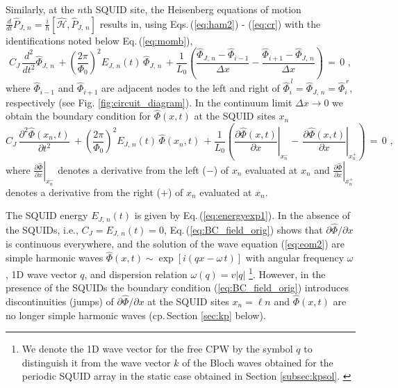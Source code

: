 Similarly, at the $n$th SQUID site, the Heisenberg equations of motion
$\displaystyle \frac{d}{dt} \hat{P}_{J,\,n} = \frac{i}{\hbar} \left[\hat{\mathcal{H}}, \hat{P}_{J,\,n} \right]$ 
results in, using Eqs.\,(\ref{eq:ham2}) - (\ref{eq:cr}) with the identifications noted below
Eq.\,(\ref{eq:momb}), 
%
\begin{equation}\label{eq:BC_discrete}
C_{J} \, \frac{d^2}{dt^2} \hat{\Phi}_{J,\,n} \, + \left(\frac{2 \pi}{\Phi_{0}} \right)^{2} E_{J,\,n}(t) \, \hat{\Phi}_{J, \, n}
\, + \frac{1}{L_{0}} 
\left( \frac{\hat{\Phi}_{J,\,n} - \hat{\Phi}_{i-1}}{\Delta x} - \frac{\hat{\Phi}_{i+1} - \hat{\Phi}_{J,\,n}}{\Delta x} \right)
\, = \, 0 \, \, ,
\end{equation}
%
where $\hat{\Phi}_{i-1}$ and $\hat{\Phi}_{i+1}$ are adjacent nodes to the left and right of 
$\hat{\Phi}_i^{\,l} = \hat{\Phi}_{J,\,n} = \hat{\Phi}_i^{\,r}$, respectively (see Fig. \ref{fig:circuit_diagram}). 
In the continuum limit $\Delta x \to 0$ we obtain the boundary condition for $\hat{\Phi}(x, t)$ 
at the SQUID sites $x_n$
%
\begin{equation}\label{eq:BC_field_orig}
C_{J} \, \frac{\partial^2 \hat{\Phi}(x_n, t)}{\partial t^2} \, + 
\left(\frac{2 \pi}{\Phi_{0}}\right)^{2} E_{J,\,n}(t) \, \hat{\Phi}(x_n, t) \, + 
\frac{1}{L_{0}}\left(\left.\frac{\partial \hat{\Phi}(x, t)}{\partial x}\right|_{x_n^{-}}
- \, \left.\frac{\partial \hat{\Phi}(x,t)}{\partial x}\right|_{x_n^{+}}\right) \, = \, 0 \, \, ,
\end{equation}
%
where $\displaystyle \left.\frac{\partial \hat{\Phi}}{\partial x}\right|_{x_n^{-}}$
denotes a derivative from the left ($-$) of $x_n$ evaluated at $x_n$ and
$\displaystyle \left.\frac{\partial \hat{\Phi}}{\partial x}\right|_{x_n^{+}}$
denotes a derivative from the right ($+$) of $x_n$ evaluated at $x_n$. 

The SQUID energy $E_{J,\,n}(t)$ is given by Eq.\,(\ref{eq:energyexp1}). 
%
In the absence of the SQUIDs, i.e., $C_J = E_{J,\,n}(t) = 0$, 
Eq.\,(\ref{eq:BC_field_orig}) shows that $\partial \hat{\Phi} / \partial x$ is 
continuous everywhere, and the solution of the wave equation (\ref{eq:eom2})
are simple harmonic waves $\hat{\Phi}(x,t) \sim \exp\left[i (q x - \omega \, t) \right]$
with angular frequency $\omega$, 1D wave vector $q$, and dispersion relation 
$\omega(q) = v |q|$
%
\footnote{We denote the 1D wave vector for the free CPW by the symbol $q$ to distinguish it 
from the wave vector $k$ of the Bloch waves obtained for the periodic SQUID array in the static case
obtained in Section \ref{subsec:kpsol}. \label{footnote:q}}.
However, in the presence of the SQUIDs the boundary condition  
(\ref{eq:BC_field_orig}) introduces discontinuities (jumps) of $\partial \hat{\Phi} / \partial x$ 
at the SQUID sites $x_n = \ell n$ and $\hat{\Phi}(x,t)$ are no longer simple harmonic waves (cp.\,Section \ref{sec:kp} below).

